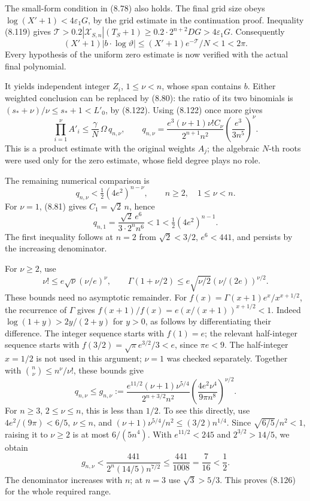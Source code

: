\documentclass[
  11pt,
  a4paper,
]{article}
\begin{document}
The small-form condition in (8.78) also holds. The final grid size obeys
\(\log(X'+1)<4\varepsilon_1G\), by the grid estimate in the continuation
proof. Inequality (8.119) gives
\(\mathcal T>0.2|\mathcal X_{S,n}|(T_S+1)
\ge0.2\cdot2^{n+2}DG>4\varepsilon_1G\). Consequently \[
(X'+1)|b\cdot\log\vartheta|
\le (X'+1)e^{-\mathcal T}/N<1<2\pi.
\] Every hypothesis of the uniform zero estimate is now verified with
the actual final polynomial.

It yields independent integer \(Z_i\), \(1\le\nu<n\), whose span
contains \(b\). Either weighted conclusion can be replaced by (8.80):
the ratio of its two binomials is \((s_*+\nu)/\nu\le s_*+1<L'_0\), by
(8.122). Using (8.122) once more gives \[
\prod_{i=1}^{\nu}A'_i
\le\frac{\gamma}{N}\,\Omega\,q_{n,\nu},
\qquad
q_{n,\nu}=
\frac{e^3(\nu+1)\nu!C_\nu}{2^{n+1}n^2}
\left(\frac{e^3}{3n^5}\right)^\nu .
\tag{8.125}
\] This is a product estimate with the original weights \(A_j\); the
algebraic \(N\)-th roots were used only for the zero estimate, whose
field degree plays no role.

The remaining numerical comparison is \[
q_{n,\nu}<\tfrac12(4e^2)^{n-\nu},
\qquad n\ge2,\quad1\le\nu<n.
\tag{8.126}
\] For \(\nu=1\), (8.81) gives \(C_1=\sqrt2\,n\), hence \[
q_{n,1}=\frac{\sqrt2\,e^6}{3\cdot2^nn^6}<1
<\tfrac12(4e^2)^{n-1}.
\] The first inequality follows at \(n=2\) from \(\sqrt2<3/2\),
\(e^6<441\), and persists by the increasing denominator.

For \(\nu\ge2\), use \[
\nu!\le e\sqrt\nu(\nu/e)^\nu,\qquad
\Gamma(1+\nu/2)\le e\sqrt{\nu/2}(\nu/(2e))^{\nu/2}.
\] These bounds need no asymptotic remainder. For
\(f(x)=\Gamma(x+1)e^x/x^{x+1/2}\), the recurrence of \(\Gamma\) gives
\(f(x+1)/f(x)=e(x/(x+1))^{x+1/2}<1\). Indeed \(\log(1+y)>2y/(2+y)\) for
\(y>0\), as follows by differentiating their difference. The integer
sequence starts with \(f(1)=e\); the relevant half-integer sequence
starts with \(f(3/2)=\sqrt\pi e^{3/2}/3<e\), since \(\pi e<9\). The
half-integer \(x=1/2\) is not used in this argument; \(\nu=1\) was
checked separately. Together with \(\binom n\nu\le n^\nu/\nu!\), these
bounds give \[
q_{n,\nu}\le
g_{n,\nu}:=
\frac{e^{11/2}(\nu+1)\nu^{5/4}}{2^{n+3/2}n^2}
\left(\frac{4e^2\nu^4}{9\pi n^8}\right)^{\nu/2}.
\tag{8.127}
\] For \(n\ge3\), \(2\le\nu\le n\), this is less than \(1/2\). To see
this directly, use \(4e^2/(9\pi)<6/5\), \(\nu\le n\), and
\((\nu+1)\nu^{5/4}/n^2\le(3/2)n^{1/4}\). Since \(\sqrt{6/5}/n^2<1\),
raising it to \(\nu\ge2\) is at most \(6/(5n^4)\). With \(e^{11/2}<245\)
and \(2^{3/2}>14/5\), we obtain \[
g_{n,\nu}<
\frac{441}{2^n(14/5)n^{7/2}}
\le\frac{441}{1008}=\frac7{16}<\frac12 .
\] The denominator increases with \(n\); at \(n=3\) use \(\sqrt3>5/3\).
This proves (8.126) for the whole required range.
\end{document}
